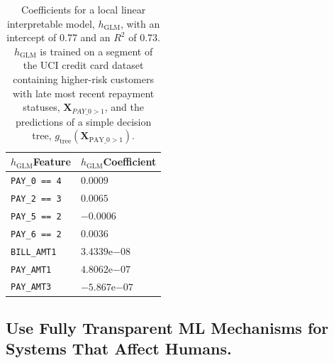 \documentclass[fleqn]{article}
\begin{document}
\begin{table}[htb!]
	\caption{Coefficients for a local linear interpretable model, $h_{\text{GLM}}$, with an intercept of 0.77 and an $R^2$ of 0.73. $h_{\text{GLM}}$ is trained on a segment of the UCI credit card dataset containing higher-risk customers with late most recent repayment statuses, $\mathbf{X}_{PAY \_ 0 > 1}$, and the predictions of a simple decision tree, $g_{\text{tree}}(\mathbf{X}_{\text{PAY\_0} > 1})$.}
		\centering
				\begin{tabular}{ | p{2cm} | p{1.7cm} | }
				\hline
				$h_{\text{GLM}}$\newline Feature & $h_{\text{GLM}}$\newline Coefficient \\ 
				\hline
				\texttt{PAY\_0 == 4} & $0.0009$ \\
				\hline
				\texttt{PAY\_2 == 3} & $0.0065$ \\
				\hline
				\texttt{PAY\_5 == 2} & $-0.0006$ \\
				\hline
				\texttt{PAY\_6 == 2} & $0.0036$ \\
				\hline				
				\texttt{BILL\_AMT1} & $3.4339\mathrm{e}{-08}$ \\
				\hline
				\texttt{PAY\_AMT1} & $4.8062\mathrm{e}{-07}$ \\
				\hline	
				\texttt{PAY\_AMT3} & $-5.867\mathrm{e}{-07}$ \\	
				\hline	
			\end{tabular}	
  		\label{tab:lime}
\end{table}	

\subsection{Use Fully Transparent ML Mechanisms for Systems That Affect Humans.} \label{sec:white_box}
\end{document}
